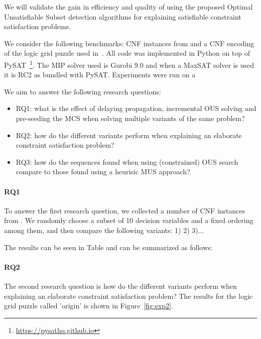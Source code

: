We will validate the gain in efficiency and quality of using the proposed Optimal Unsatisfiable Subset detection algorithms for explaining satisfiable constraint satisfaction problems.

We consider the following benchmarks: CNF instances  from  and a CNF encoding of the logic grid puzzle used in~\cite{ecai/BogaertsGCG20}. All code was implemented in Python on top of %
PySAT~\footnote{\url{https://pysathq.github.io}}. The MIP solver used is Gurobi 9.0 and when a MaxSAT solver is used it is RC2 as bundled with PySAT. Experiments were run on a 

We aim to answer the following research questions:
\begin{itemize}
\item RQ1: what is the effect of delaying propagation, incremental OUS solving and pre-seeding the MCS when solving multiple variants of the same problem?
\item RQ2: how do the different variants perform when explaining an elaborate constraint satisfaction problem?
\item RQ3: how do the sequences found when using (constrained) OUS search compare to those found using a heurisic MUS approach?
\end{itemize}

\paragraph{RQ1}
To answer the first research question, we collected a number of CNF instances from . We randomly choose a subset of 10 decision variables and a fixed ordering among them, and then compare the following variants: 1) 2) 3)... 

The results can be seen in Table  and can be summarized as follows: 


\paragraph{RQ2}
The second research question is how do the different variants perform when explaining an elaborate constraint satisfaction problem? The results for the logic grid puzzle called 'origin' is shown in Figure~\ref{fig:exp2}.


